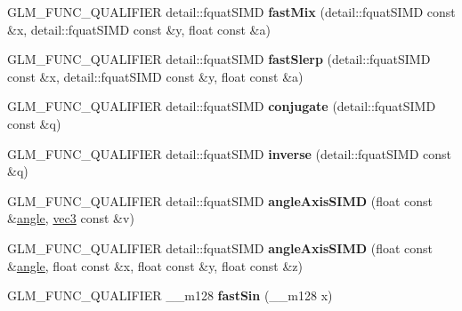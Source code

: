 \begin{DoxyCompactItemize}
\item 
G\+L\+M\+\_\+\+F\+U\+N\+C\+\_\+\+Q\+U\+A\+L\+I\+F\+I\+ER detail\+::fquat\+S\+I\+MD {\bfseries fast\+Mix} (detail\+::fquat\+S\+I\+MD const \&x, detail\+::fquat\+S\+I\+MD const \&y, float const \&a)\hypertarget{namespaceglm_acf0fe775efd8a75dc6dc603efd157231}{}\label{namespaceglm_acf0fe775efd8a75dc6dc603efd157231}

\item 
G\+L\+M\+\_\+\+F\+U\+N\+C\+\_\+\+Q\+U\+A\+L\+I\+F\+I\+ER detail\+::fquat\+S\+I\+MD {\bfseries fast\+Slerp} (detail\+::fquat\+S\+I\+MD const \&x, detail\+::fquat\+S\+I\+MD const \&y, float const \&a)\hypertarget{namespaceglm_a57c9ec50932abd564671a28cd7ba53e0}{}\label{namespaceglm_a57c9ec50932abd564671a28cd7ba53e0}

\item 
G\+L\+M\+\_\+\+F\+U\+N\+C\+\_\+\+Q\+U\+A\+L\+I\+F\+I\+ER detail\+::fquat\+S\+I\+MD {\bfseries conjugate} (detail\+::fquat\+S\+I\+MD const \&q)\hypertarget{namespaceglm_a079af2a66c2439c64053382e8c98f213}{}\label{namespaceglm_a079af2a66c2439c64053382e8c98f213}

\item 
G\+L\+M\+\_\+\+F\+U\+N\+C\+\_\+\+Q\+U\+A\+L\+I\+F\+I\+ER detail\+::fquat\+S\+I\+MD {\bfseries inverse} (detail\+::fquat\+S\+I\+MD const \&q)\hypertarget{namespaceglm_ad723ad1f3ef20438ade0e0c95002f187}{}\label{namespaceglm_ad723ad1f3ef20438ade0e0c95002f187}

\item 
G\+L\+M\+\_\+\+F\+U\+N\+C\+\_\+\+Q\+U\+A\+L\+I\+F\+I\+ER detail\+::fquat\+S\+I\+MD {\bfseries angle\+Axis\+S\+I\+MD} (float const \&\hyperlink{group__gtc__quaternion_ga23a3fc7ada5bbb665ff84c92c6e0542c}{angle}, \hyperlink{group__core__types_ga1c47e8b3386109bc992b6c48e91b0be7}{vec3} const \&v)\hypertarget{namespaceglm_a635900a97b69fe25d76c029f130a1c8f}{}\label{namespaceglm_a635900a97b69fe25d76c029f130a1c8f}

\item 
G\+L\+M\+\_\+\+F\+U\+N\+C\+\_\+\+Q\+U\+A\+L\+I\+F\+I\+ER detail\+::fquat\+S\+I\+MD {\bfseries angle\+Axis\+S\+I\+MD} (float const \&\hyperlink{group__gtc__quaternion_ga23a3fc7ada5bbb665ff84c92c6e0542c}{angle}, float const \&x, float const \&y, float const \&z)\hypertarget{namespaceglm_a8ae8890bd658ce7217abc2112e3dca35}{}\label{namespaceglm_a8ae8890bd658ce7217abc2112e3dca35}

\item 
G\+L\+M\+\_\+\+F\+U\+N\+C\+\_\+\+Q\+U\+A\+L\+I\+F\+I\+ER \+\_\+\+\_\+m128 {\bfseries fast\+Sin} (\+\_\+\+\_\+m128 x)\hypertarget{namespaceglm_a81de908720e51f26e86e18d37aa5cc3b}{}\label{namespaceglm_a81de908720e51f26e86e18d37aa5cc3b}


\end{DoxyCompactItemize}
